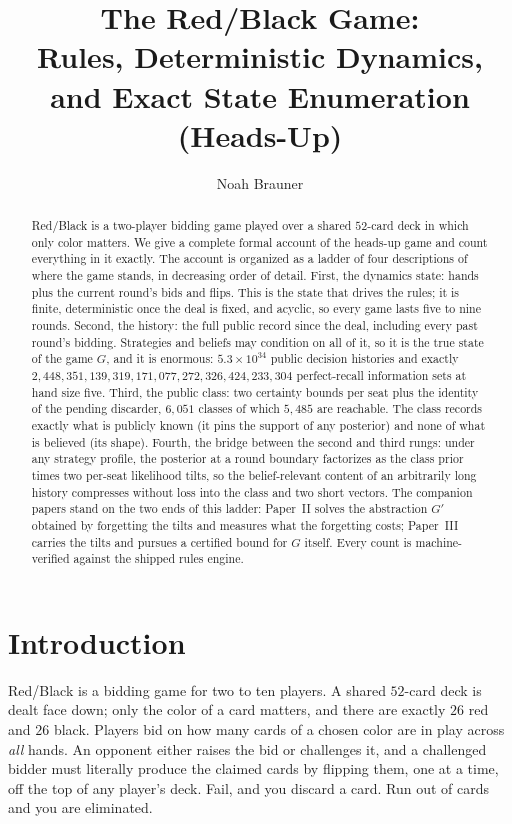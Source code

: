 \documentclass[11pt]{article}
\title{\bfseries The Red/Black Game:\\[2pt]
       \large Rules, Deterministic Dynamics, and Exact State Enumeration\\[4pt]
       \normalsize (Heads-Up)}
\author{Noah Brauner}
\date{}
\theoremstyle{plain}
\theoremstyle{definition}
\theoremstyle{remark}
\begin{document}
\maketitle
\vspace{-3.2em}

\begin{abstract}
\noindent
Red/Black is a two-player bidding game played over a shared $52$-card deck
in which only color matters. We give a complete formal account of the
heads-up game and count everything in it exactly. The account is organized
as a ladder of four descriptions of where the game stands, in decreasing
order of detail. First, the dynamics state: hands plus the current round's
bids and flips. This is the state that drives the rules; it is finite,
deterministic once the deal is fixed, and acyclic, so every game lasts five
to nine rounds. Second, the history: the full public record since the deal,
including every past round's bidding. Strategies and beliefs may condition
on all of it, so it is the true state of the game $G$, and it is enormous:
$5.3\times10^{34}$ public decision histories and exactly
$2{,}448{,}351{,}139{,}319{,}171{,}077{,}272{,}326{,}424{,}233{,}304$
perfect-recall information sets at hand size five. Third, the public class:
two certainty bounds per seat plus the identity of the pending discarder,
$6{,}051$ classes of which $5{,}485$ are reachable. The class records
exactly what is publicly known (it pins the support of any posterior) and
none of what is believed (its shape). Fourth, the bridge between the second
and third rungs: under any strategy profile, the posterior at a round
boundary factorizes as the class prior times two per-seat likelihood tilts,
so the belief-relevant content of an arbitrarily long history compresses
without loss into the class and two short vectors. The companion papers
stand on the two ends of this ladder: Paper~II solves the abstraction $G'$
obtained by forgetting the tilts and measures what the forgetting costs;
Paper~III carries the tilts and pursues a certified bound for $G$ itself.
Every count is machine-verified against the shipped rules engine.
\end{abstract}

\section{Introduction}

Red/Black is a bidding game for two to ten players. A shared $52$-card deck
is dealt face down; only the color of a card matters, and there are exactly
$26$ red and $26$ black. Players bid on how many cards of a chosen color
are in play across \emph{all} hands. An opponent either raises the bid or
challenges it, and a challenged bidder must literally produce the claimed
cards by flipping them, one at a time, off the top of any player's deck.
Fail, and you discard a card. Run out of cards and you are eliminated.
\end{document}
